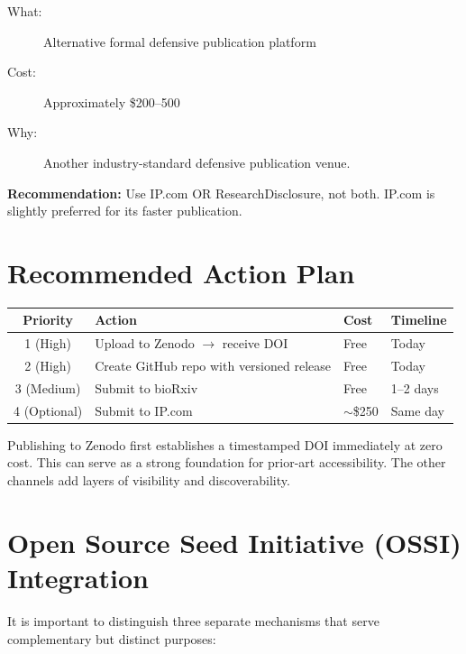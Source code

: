 \documentclass[12pt,a4paper]{article}
\begin{document}
\begin{description}
  \item[What:] Alternative formal defensive publication platform
  \item[Cost:] Approximately \$200--500
  \item[Why:] Another industry-standard defensive publication venue.
\end{description}

\noindent\textbf{Recommendation:} Use IP.com OR ResearchDisclosure, not both. IP.com is slightly preferred for its faster publication.

\section{Recommended Action Plan}

\begin{longtable}{c l l l}
\toprule
\textbf{Priority} & \textbf{Action} & \textbf{Cost} & \textbf{Timeline} \\
\midrule
1 (High) & Upload to Zenodo $\rightarrow$ receive DOI & Free & Today \\
2 (High) & Create GitHub repo with versioned release & Free & Today \\
3 (Medium) & Submit to bioRxiv & Free & 1--2 days \\
4 (Optional) & Submit to IP.com & $\sim$\$250 & Same day \\
\bottomrule
\end{longtable}

\noindent Publishing to Zenodo first establishes a timestamped DOI immediately at zero cost. This can serve as a strong foundation for prior-art accessibility. The other channels add layers of visibility and discoverability.

\section{Open Source Seed Initiative (OSSI) Integration}
\label{sec:ossi}

It is important to distinguish three separate mechanisms that serve complementary but distinct purposes:
\end{document}
